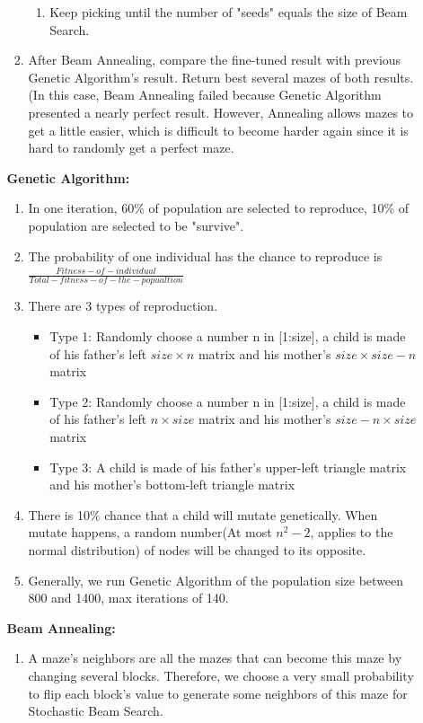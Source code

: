 \documentclass[letter]{article}
\begin{document}
\begin{enumerate}[resume]
\begin{enumerate}
\begin{enumerate}
\begin{enumerate}
					\item {Keep picking until the number of "seeds" equals the size of Beam Search.}
				\end{enumerate}
			
				\item {After Beam Annealing, compare the fine-tuned result with previous Genetic Algorithm's result. Return best several mazes of both results. (In this case, Beam Annealing failed because Genetic Algorithm presented a nearly perfect result. However, Annealing allows mazes to get a little easier, which is difficult to become harder again since it is hard to randomly get a perfect maze.} 
			\end{enumerate} 
		
			\textbf{Genetic Algorithm:} \\
			\begin{enumerate}
				\item {In one iteration, 60\% of population are selected to reproduce, 10\% of population are selected to be "survive". }
				\item {The probability of one individual has the chance to reproduce is $ \frac{Fitness-of-individual}{Total-fitness-of-the-popualtion} $}
				\item {There are 3 types of reproduction. }
				\begin{itemize}
					\item {Type 1: Randomly choose a number n in [1:size], a child is made of his father's left $ size \times n$ matrix and his mother's $ size \times size - n$ matrix}
					\item {Type 2: Randomly choose a number n in [1:size], a child is made of his father's left $ n \times size$ matrix and his mother's $ size - n \times size$ matrix}
					\item {Type 3: A child is made of his father's upper-left triangle matrix and his mother's bottom-left triangle matrix}
				\end{itemize}
				\item {There is 10\% chance that a child will mutate genetically. When mutate happens, a random number(At most $ n^2 - 2$, applies to the normal distribution) of nodes will be changed to its opposite.}
				\item {Generally, we run Genetic Algorithm of the population size between 800 and 1400, max iterations of 140.}
			\end{enumerate}
			
			\textbf{Beam Annealing:} \\
			\begin{enumerate}
				\item {A maze's neighbors are all the mazes that can become this maze by changing several blocks. Therefore, we choose a very small probability to flip each block's value to generate some neighbors of this maze for Stochastic Beam Search.} \\
				

\end{enumerate}
\end{enumerate}
\end{enumerate}
\end{document}
